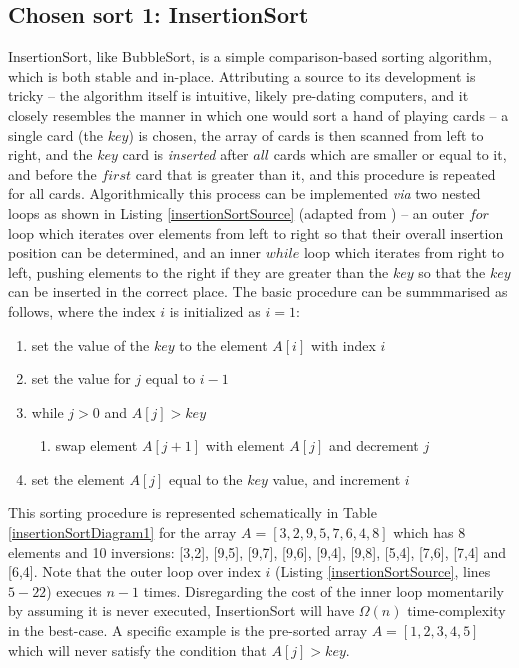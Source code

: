 \documentclass[12pt,a4paper]{article}
\begin{document}
\clearpage


\subsection{Chosen sort 1: InsertionSort}
InsertionSort, like BubbleSort, is a simple comparison-based sorting algorithm, which is both stable and in-place.  Attributing a source to its development is tricky -- the algorithm itself is intuitive, likely pre-dating computers, and it closely resembles the manner in which one would sort a hand of playing cards -- a single card (the $key$) is chosen, the array of cards is then scanned from left to right, and the $key$ card is \emph{inserted} after $all$ cards which are smaller or equal to it, and before the $first$ card that is greater than it, and this procedure is repeated for all cards. Algorithmically this process can be implemented \emph{via} two nested loops as shown in Listing \ref{insertionSortSource} (adapted from \cite{heineman_algorithms_2009}) -- an outer $for$ loop which iterates over elements from left to right so that their overall insertion position can be determined, and an inner $while$ loop which iterates from right to left, pushing elements to the right if they are greater than the $key$ so that the $key$ can be inserted in the correct place. The basic procedure can be summmarised as follows, where the index $i$ is initialized as $i=1$:

\begin{enumerate}
\item set the value of the $key$ to the element $A[i]$ with index $i$
\item set the value for $j$ equal to $i-1$
\item while $j>0$ and $A[j] > key$
\begin{enumerate}
\item swap element $A[j+1]$ with element $A[j]$ and decrement $j$
\end{enumerate}
\item set the element $A[j]$ equal to the $key$ value, and increment $i$
\end{enumerate}

This sorting procedure is represented schematically in Table \ref{insertionSortDiagram1} for the array $A = [3,2,9,5,7,6,4,8]$ which has 8 elements and 10 inversions: [3,2], [9,5], [9,7], [9,6], [9,4], [9,8], [5,4], [7,6], [7,4] and [6,4]. Note that the outer loop over index $i$ (Listing \ref{insertionSortSource}, lines $5-22$) execues $n-1$ times. Disregarding the cost of the inner loop momentarily by assuming it is never executed, InsertionSort will have $\Omega(n)$ time-complexity in the best-case. A specific example is the pre-sorted array $A = [1,2,3,4,5]$ which will never satisfy the condition that $A[j] > key$. 
\end{document}
